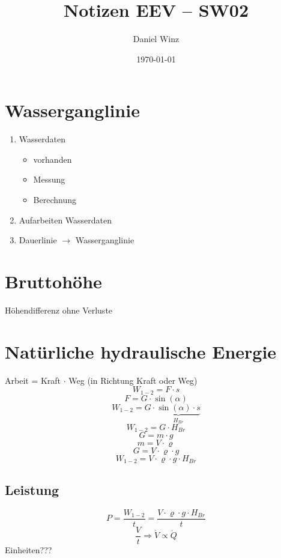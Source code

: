 \documentclass[a4,paper,fleqn]{article}
\title{Notizen EEV -- SW02}
\date{\today}
\author{Daniel Winz}
\begin{document}
\maketitle
\clearpage

\section{Wasserganglinie}
\begin{enumerate}
    \item Wasserdaten
    \begin{itemize}
        \item vorhanden
        \item Messung
        \item Berechnung
    \end{itemize}
    \item Aufarbeiten Wasserdaten
    \item Dauerlinie $\to$ Wasserganglinie
\end{enumerate}

\section{Bruttohöhe}
Höhendifferenz ohne Verluste

\section{Natürliche hydraulische Energie}
\begin{figure}[h!]
\end{figure}
Arbeit = Kraft $\cdot$ Weg (in Richtung Kraft oder Weg)
\[ W_{1-2} = F \cdot s \]
\[ F = G \cdot \sin(\alpha) \]
\[ W_{1-2} = G \cdot \underbrace{\sin(\alpha) \cdot s}_{H_{Br}} \]
\[ W_{1-2} = G \cdot H_{Br} \]
\[ G = m \cdot g \]
\[ m = V \cdot \varrho \]
\[ G = V \cdot \varrho \cdot g \]
\[ \boxed{W_{1-2} = V \cdot \varrho \cdot g \cdot H_{Br}} \]

\subsection{Leistung}
\[ P = \frac{W_{1-2}}{t} = \frac{V \cdot \varrho \cdot g \cdot H_{Br}}{t} \]
\[ \frac{V}{t} \Rightarrow \dot{V} \propto \dot{Q} \]
Einheiten???
\end{document}
